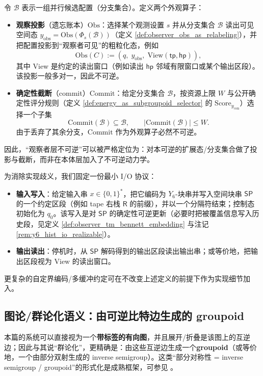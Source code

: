 \begin{definition}\label{def:observer_tm_obs_commit}
令 \(\mathcal B\) 表示一组并行候选配置（分支集合）。定义两个外观算子：
\begin{itemize}
  \item \textbf{观察投影}（遗忘账本）\(\mathrm{Obs}\)：选择某个观测设置 \(s\) 并从分支集合 \(\mathcal B\) 读出可见空间态 \(y_{\mathrm{obs}}=\mathrm{Obs}(\Phi_s(\mathcal B))\)（定义 \ref{def:observer_obs_as_relabeling}），并把配置投影到“观察者可见”的粗粒化态，例如
  $$
  \mathrm{Obs}(C):=(q,\;y_{\mathrm{obs}},\;\mathrm{View}(\mathsf{tp},\mathsf{hp})),
  $$
  其中 \(\mathrm{View}\) 是约定的读出窗口（例如读出 \(\mathsf{hp}\) 邻域有限窗口或某个输出区段）。该投影一般多对一，因此不可逆。
  \item \textbf{确定性截断}（commit）\(\mathrm{Commit}\)：给定分支集合 \(\mathcal B\)，按资源上限 \(W\) 与公开确定性评分规则（定义 \ref{def:energy_as_subgroupoid_selector} 的 \(\mathrm{Score}_{y_{\mathrm{con}}}\)）选择一个子集
  $$
  \mathrm{Commit}(\mathcal B)\subseteq \mathcal B,\qquad |\mathrm{Commit}(\mathcal B)|\le W.
  $$
  由于丢弃了其余分支，\(\mathrm{Commit}\) 作为外观算子必然不可逆。
\end{itemize}
因此，“观察者层不可逆”可以被严格定位为：对本可逆的扩展态/分支集合做了投影与截断，而非在本体层加入了不可逆动力学。
\end{definition}

\begin{definition}[I/O 协议（可直接实现）]\label{def:observer_tm_io_protocol}
为消除实现歧义，我们固定一份最小 I/O 协议：
\begin{itemize}
  \item \textbf{输入写入}：给定输入串 \(x\in\{0,1\}^\ast\)，把它编码为 \(Y_6\)-块串并写入空间块串 \(\mathsf{SP}\) 的一个约定区段（例如 tape 右栈 \(\mathsf{R}\) 的前缀），并以一个分隔符结束；控制态初始化为 \(q_0\)。该写入是对 \(\mathsf{SP}\) 的确定性可逆更新（必要时把被覆盖信息写入历史段，见定义 \ref{def:observer_tm_bennett_embedding} 与注记 \ref{rem:y6_hist_io_realizable}）。
  \item \textbf{输出读出}：停机时，从 \(\mathsf{SP}\) 解码得到的输出区段读出输出串；或等价地，把输出区段视为 \(\mathrm{View}\) 的读出窗口。
\end{itemize}
更复杂的自定界编码/多缓冲约定可在不改变上述定义的前提下作为实现细节加入。
\end{definition}

\subsection{图论/群论化语义：由可逆比特边生成的 groupoid}\label{subsec:graph_groupoid_semantics}
本篇的系统可以直接视为一个\textbf{带标签的有向图}，并且展开/折叠是该图上的互逆边；因此与其说“群论化”，更精确是：由这些互逆边生成一个\textbf{groupoid}（或等价地，一个由部分双射生成的 inverse semigroup）。这类“部分对称性 = inverse semigroup / groupoid”的形式化是成熟框架，可参见 \cite{Lawson1998,Paterson1999}。

